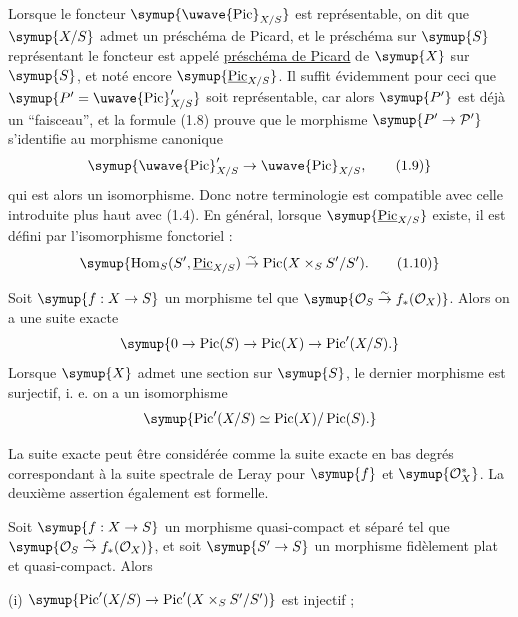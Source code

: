 Lorsque le foncteur $\symup{\mathop{\text{\uwave{Pic}}}\nolimits_{X/S}}$ est représentable, on dit que
$\symup{X/S}$ admet un préschéma de Picard, et le préschéma sur $\symup{S}$ représentant le
foncteur est appelé \uline{préschéma de Picard} de $\symup{X}$ sur $\symup{S}$, et noté encore
$\symup{\underline{\operatorname{Pic}}_{X/S}}$. Il suffit évidemment pour ceci que
$\symup{P'=\mathop{\text{\uwave{Pic}}}\nolimits'_{X/S}}$ soit représentable, car alors $\symup{P'}$ est déjà un
``faisceau'', et la formule (1.8) prouve que le morphisme
$\symup{P'\to\mathcal P'}$ s'identifie au morphisme canonique
\begin{equation}
\symup{\mathop{\text{\uwave{Pic}}}\nolimits'_{X/S}\to\mathop{\text{\uwave{Pic}}}\nolimits_{X/S},
\tag{1.9}}
\end{equation}
qui est alors un isomorphisme. Donc notre terminologie est compatible avec
celle introduite plus haut avec (1.4). En général, lorsque
$\symup{\underline{\operatorname{Pic}}_{X/S}}$ existe, il est défini par l'isomorphisme fonctoriel :
\begin{equation}
\symup{\operatorname{Hom}_S(S',\underline{\operatorname{Pic}}_{X/S})\overset{\sim}{\to}
\operatorname{Pic}(X\times_SS'/S').
\tag{1.10}}
\end{equation}


 Soit $\symup{f:X\to S}$ un morphisme tel que
$\symup{\mathcal O_S\overset{\sim}{\to}f_*(\mathcal O_X)}$. Alors on a une suite exacte
\[
\symup{0\to\operatorname{Pic}(S)\to\operatorname{Pic}(X)
\to\operatorname{Pic}'(X/S).}
\]
Lorsque $\symup{X}$ admet une section sur $\symup{S}$, le dernier morphisme est surjectif, i. e.
on a un isomorphisme
\[
\symup{\operatorname{Pic}'(X/S)\simeq
\operatorname{Pic}(X)/\operatorname{Pic}(S).}
\]

La suite exacte peut être considérée comme la suite exacte en bas degrés
correspondant à la suite spectrale de Leray pour $\symup{f}$ et $\symup{\mathcal O_X^*}$. La
deuxième assertion également est formelle.

 Soit $\symup{f:X\to S}$ un morphisme
quasi-compact et séparé tel que
$\symup{\mathcal O_S\overset{\sim}{\to}f_*(\mathcal O_X)}$, et soit
$\symup{S'\to S}$ un morphisme fidèlement plat et quasi-compact. Alors

\noindent (i) $\symup{\operatorname{Pic}'(X/S)\to
\operatorname{Pic}'(X\times_SS'/S')}$ est injectif ;

